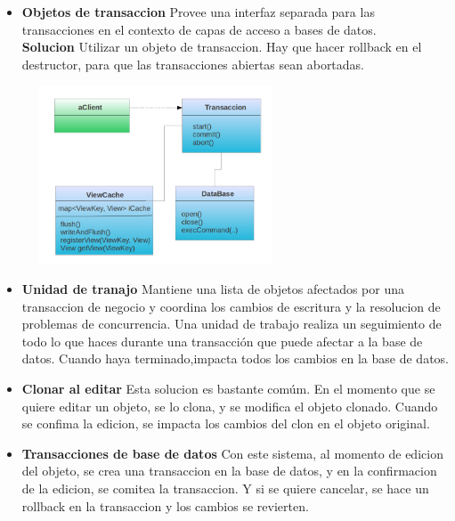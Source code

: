 \begin {itemize}

\item {\bf Objetos de transaccion}
Provee una interfaz separada para las transacciones en el contexto de capas de
acceso a bases de datos.\\
{\bf Solucion} Utilizar un objeto de transaccion. Hay que hacer rollback en el
destructor, para que las transacciones abiertas sean abortadas.

\includegraphics[width=300px, height=200px]{img/objectTransaction}

\item {\bf Unidad de tranajo }
Mantiene una lista de objetos afectados por una transaccion de negocio y
coordina los cambios de escritura y la resolucion de problemas de concurrencia.
Una unidad de trabajo realiza un seguimiento de todo lo que haces durante una
transacción que puede afectar a la base de datos. 
Cuando haya terminado,impacta todos los cambios en la base de datos.

\item {\bf Clonar al editar}
Esta solucion es bastante comúm. En el momento que se quiere editar un objeto,
se lo clona, y se modifica el objeto clonado. Cuando se confima la edicion, se
impacta los cambios del clon en el objeto original.

\item {\bf Transacciones de base de datos}
Con este sistema, al momento de edicion del objeto, se crea una transaccion en
la base de datos, y en la confirmacion de la edicion, se comitea la transaccion.
Y si se quiere cancelar, se hace un rollback en la transaccion y los cambios se
revierten.

\end {itemize}

